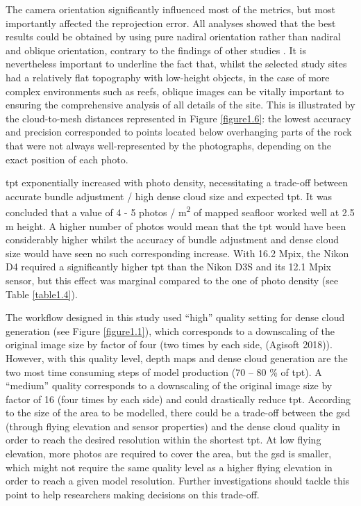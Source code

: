 The camera orientation significantly influenced most of the metrics, but most importantly affected the reprojection error. All analyses showed that the best results could be obtained by using pure nadiral orientation rather than nadiral and oblique orientation, contrary to the findings of other studies \citep{chiabrando_influence_2017}. It is nevertheless important to underline the fact that, whilst the selected study sites had a relatively flat topography with low-height objects, in the case of more complex environments such as reefs, oblique images can be vitally important to ensuring the comprehensive analysis of all details of the site. This is illustrated by the cloud-to-mesh distances represented in Figure \ref{figure1.6}: the lowest accuracy and precision corresponded to points located below overhanging parts of the rock that were not always well-represented by the photographs, depending on the exact position of each photo.

\acrshort{tpt} exponentially increased with photo density, necessitating a trade-off between accurate bundle adjustment / high dense cloud size and expected \acrshort{tpt}. It was concluded that a value of 4 - 5 photos / m\textsuperscript{2} of mapped seafloor worked well at 2.5 m height. A higher number of photos would mean that the \acrshort{tpt} would have been considerably higher whilst the accuracy of bundle adjustment and dense cloud size would have seen no such corresponding increase. With 16.2 Mpix, the Nikon D4 required a significantly higher \acrshort{tpt} than the Nikon D3S and its 12.1 Mpix sensor, but this effect was marginal compared to the one of photo density (see Table \ref{table1.4}).

The workflow designed in this study used “high” quality setting for dense cloud generation (see Figure \ref{figure1.1}), which corresponds to a downscaling of the original image size by factor of four (two times by each side, (Agisoft 2018)). However, with this quality level, depth maps and dense cloud generation are the two most time consuming steps of model production (70 – 80 \% of \acrshort{tpt}). A “medium” quality corresponds to a downscaling of the original image size by factor of 16 (four times by each side) and could drastically reduce \acrshort{tpt}. According to the size of the area to be modelled, there could be a trade-off between the \acrshort{gsd} (through flying elevation and sensor properties) and the dense cloud quality in order to reach the desired resolution within the shortest \acrshort{tpt}. At low flying elevation, more photos are required to cover the area, but the \acrshort{gsd} is smaller, which might not require the same quality level as a higher flying elevation in order to reach a given model resolution. Further investigations should tackle this point to help researchers making decisions on this trade-off.

